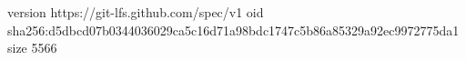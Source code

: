 version https://git-lfs.github.com/spec/v1
oid sha256:d5dbcd07b0344036029ca5c16d71a98bdc1747c5b86a85329a92ec9972775da1
size 5566
